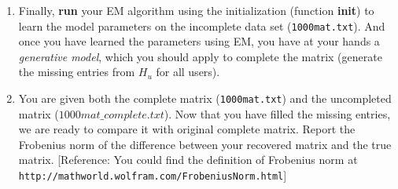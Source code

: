 \begin{enumerate}
\begin{enumerate}
\item Finally, \textbf{run} your EM algorithm using the initialization (function \textbf{init}) to learn the model parameters on the incomplete data set (\texttt{1000mat.txt}). And once you have learned the parameters using EM, you have at your hands a \emph{generative model}, which you should apply to complete the matrix (generate the missing entries from $H_u$ for all users).

\item You are given both the complete matrix (\texttt{1000mat.txt}) and the uncompleted matrix (\texttt{$1000mat\_complete.txt$}). Now that you have filled the missing entries, we are ready to compare it with original complete matrix. Report the Frobenius norm of the difference between your recovered matrix and the true matrix. 
[Reference: You could find the definition of Frobenius norm at \texttt{http://mathworld.wolfram.com/FrobeniusNorm.html}]
    
\end{enumerate}


\end{enumerate}





 